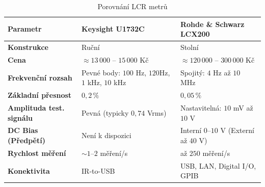 \begin{table}[h!]
    \centering
    \caption{Porovnání LCR metrů \cite{RS_LCX_Datasheet} \cite{Keysight_U1732C_Datasheet}}
    \label{tab:comparison}
    \vspace{0.2cm}
    
    \begin{tabularx}{\textwidth}{@{} l >{\raggedright\arraybackslash}X >{\raggedright\arraybackslash}X @{}}
    \toprule
    \textbf{Parametr}               & \textbf{Keysight U1732C}                  & \textbf{Rohde \& Schwarz LCX200}                  \\ \midrule
    \textbf{Konstrukce}             & Ruční                                     & Stolní                                            \\ \addlinespace
    \textbf{Cena}                   & $\approx 13\,000$ – $15\,000$ Kč              & $\approx 120\,000$ – $300\,000$ Kč                   \\ \addlinespace
    \textbf{Frekvenční rozsah}      & Pevné body: $100$ Hz, $120$Hz, $1$ kHz, $10$ kHz & Spojitý: $4$ Hz až $10$ MHz                       \\ \addlinespace
    \textbf{Základní přesnost}      & $0,2\,\%$                                 & $0,05\,\%$                                        \\ \addlinespace
    \textbf{Amplituda test. signálu}& Pevná (typicky $0,74$ Vrms)               & Nastavitelná: $10$ mV až $10$ V                   \\ \addlinespace
    \textbf{DC Bias (Předpětí)}     & Není k dispozici                          & Interní $0$--$10$ V (Externí až $40$ V)           \\ \addlinespace
    \textbf{Rychlost měření}        & $\sim 1$--$2$ měření/s                    & až $250$ měření/s                   \\ \addlinespace
    \textbf{Konektivita}            & IR-to-USB                                 & USB, LAN, Digital I/O, GPIB                       \\ \bottomrule
    \end{tabularx}
    
    
\end{table}

